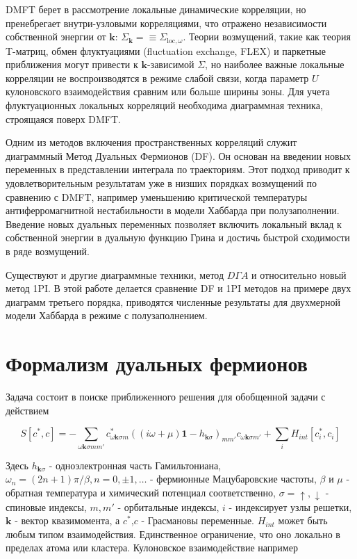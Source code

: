 \documentclass[11pt,a4paper]{report}
\begin{document}
DMFT берет в рассмотрение локальные динамические корреляции, но пренебрегает внутри-узловыми корреляциями, что отражено независимости собственной энергии от $\mathbf{k}$: $\Sigma_\mathbf{k}=\equiv \Sigma_{\text{loc},\omega}$. 
Теории возмущений, такие как теория T-матриц, обмен флуктуациями (fluctuation exchange, FLEX) и паркетные приближения\cite{bickers} могут привести к $\mathbf{k}$-зависимой $\Sigma$,
но наиболее важные локальные корреляции не воспроизводятся в режиме слабой связи, когда параметр $U$ кулоновского взаимодействия сравним или больше ширины зоны.
Для учета флуктуационных локальных корреляций необходима диаграммная техника, строящаяся поверх DMFT.

Одним из методов включения пространственных корреляций служит диаграммный Метод Дуальных Фермионов (DF)\cite{PhysRevB.77.033101}. Он основан на введении новых переменных в представлении интеграла по траекториям.
Этот подход приводит к удовлетворительным результатам уже в низших порядках возмущений по сравнению с DMFT, например уменьшению критической температуры антиферромагнитной нестабильности в модели Хаббарда 
при полузаполнении\cite{PhysRevB.77.195105}. Введение новых дуальных переменных позволяет включить локальный вклад к собственной энергии в дуальную функцию Грина и достичь быстрой сходимости в ряде возмущений.

Существуют и другие диаграммные техники, метод $D\Gamma A$\cite{toschi2007dynamical}\cite{katanin2009comparing} и относительно новый метод 1PI\cite{katanin}. 
В этой работе делается сравнение DF и 1PI методов на примере двух диаграмм третьего порядка, приводятся численные результаты для двухмерной модели Хаббарда в режиме с полузаполнением.

\section{Формализм дуальных фермионов}
Задача состоит в поиске приближенного решения для обобщенной задачи с действием

\begin{equation}
\label{action}
 S\left[c^*,c\right] = - \sum_{\omega\mathbf{k}\sigma m m'} c^*_{\omega\mathbf{k}\sigma m} ((i\omega+\mu)\mathbf{1}-h_{\mathbf{k}\sigma})_{m m'}c_{\omega\mathbf{k}\sigma m'} + \sum_i H_{int}[c_i^*,c_i]
\end{equation}

Здесь $h_{\mathbf{k}\sigma}$ - одноэлектронная часть Гамильтониана, $\omega_n=(2n+1)\pi/\beta,n = 0,\pm 1,\dots$ - фермионные Мацубаровские частоты, 
$\beta$ и $\mu$ - обратная температура и химический потенциал соответственно, $\sigma=\uparrow,\downarrow$ - спиновые индексы,
$m,m'$ - орбитальные индексы, $i$ - индексирует узлы решетки, $\mathbf{k}$ - вектор квазимомента, а $c^*$,$c$ - Грасмановы переменные. 
$H_{int}$ может быть любым типом взаимодействия. Единственное ограничение, что оно локально в пределах атома или кластера. Кулоновское взаимодействие например
\end{document}
